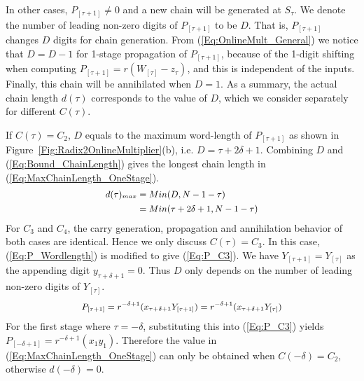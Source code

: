 \documentclass{acm_proc_article-sp}
\begin{document}
%
In other cases, $P_{[\tau+1]}\!\neq\!0$ and a new chain will be generated at $S_{\tau}$. We denote the number of leading non-zero digits of $P_{[\tau+1]}$ to be $D$. That is, $P_{[\tau+1]}$ changes $D$ digits for chain generation. From (\ref{Eq:OnlineMult_General}) we notice that $D\!=\!D\!-\!1$ for 1-stage propagation of $P_{[\tau+1]}$, because of the 1-digit shifting when computing $P_{[\tau+1]}=r(W_{[\tau]}-z_{\tau})$, and this is independent of the inputs. Finally, this chain will be annihilated when $D\!=\!1$. As a summary, the actual chain length $d(\tau)$ corresponds to the value of $D$, which we consider separately for different $C(\tau)$.\vspace{-1ex}

If $C(\tau)=C_2$, $D$ equals to the maximum word-length of $P_{[\tau+1]}$ as shown in Figure~\ref{Fig:Radix2OnlineMultiplier}(b), i.e. $D=\tau+2\delta+1$. Combining $D$ and (\ref{Eq:Bound_ChainLength}) gives the longest chain length in (\ref{Eq:MaxChainLength_OneStage}).
%
%
\begin{eqnarray}\label{Eq:MaxChainLength_OneStage}
\footnotesize
    \begin{aligned}
        d(\tau)_{max} &= Min(D,N-1-\tau)\\
                      &= Min(\tau+2\delta+1,N-1-\tau)
    \end{aligned}
\normalsize
\end{eqnarray}
%
For $C_3$ and $C_4$, the carry generation, propagation and annihilation behavior of both cases are identical. Hence we only discuss $C(\tau)=C_3$. In this case, (\ref{Eq:P_Wordlength}) is modified to give (\ref{Eq:P_C3}). We have $Y_{[\tau+1]}=Y_{[\tau]}$ as the appending digit $y_{\tau+\delta+1}=0$. Thus $D$ only depends on the number of leading non-zero digits of $Y_{[\tau]}$.
%
\begin{eqnarray}\label{Eq:P_C3}
\footnotesize
  P_{[\tau+1]}=r^{-\delta+1}(x_{\tau+\delta+1}Y_{[\tau+1]})=r^{-\delta+1}(x_{\tau+\delta+1}Y_{[\tau]})
\normalsize
\end{eqnarray}
%
For the first stage where $\tau=-\delta$, substituting this into (\ref{Eq:P_C3}) yields $P_{[-\delta+1]}=r^{-\delta+1}(x_1y_1)$. Therefore the value in (\ref{Eq:MaxChainLength_OneStage}) can only be obtained when $C(-\delta)=C_2$, otherwise $d(-\delta)=0$.\vspace{-1ex}
\end{document}

